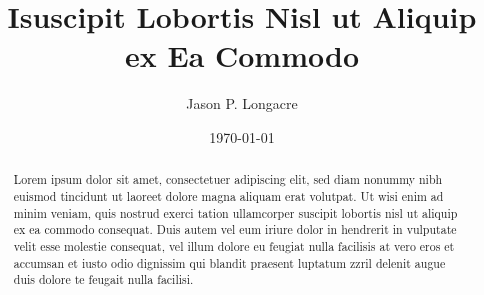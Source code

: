\documentclass{revtex4}
\begin{document}

\title{Isuscipit Lobortis Nisl ut Aliquip ex Ea Commodo}


\author{Jason P. Longacre}


\date{\today}

\begin{abstract}
Lorem ipsum dolor sit amet, consectetuer adipiscing elit, sed diam
nonummy nibh euismod tincidunt ut laoreet dolore magna aliquam erat
volutpat. Ut wisi enim ad minim veniam, quis nostrud exerci tation
ullamcorper suscipit lobortis nisl ut aliquip ex ea commodo consequat.
Duis autem vel eum iriure dolor in hendrerit in vulputate velit esse
molestie consequat, vel illum dolore eu feugiat nulla facilisis at
vero eros et accumsan et iusto odio dignissim qui blandit praesent
luptatum zzril delenit augue duis dolore te feugait nulla facilisi.
\end{abstract}



\maketitle
\end{document}
